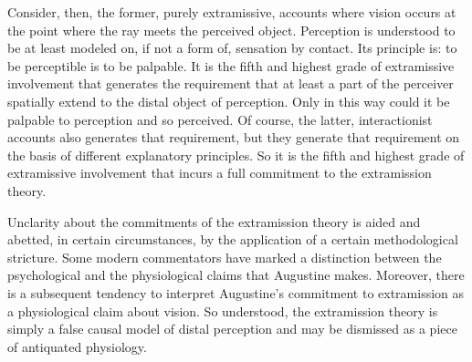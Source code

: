 \documentclass[12pt]{article}
\begin{document}
Consider, then, the former, purely extramissive, accounts where vision occurs at the point where the ray meets the perceived object. Perception is understood to be at least modeled on, if not a form of, sensation by contact. Its principle is: to be perceptible is to be palpable. It is the fifth and highest grade of extramissive involvement that generates the requirement that at least a part of the perceiver spatially extend to the distal object of perception. Only in this way could it be palpable to perception and so perceived. Of course, the latter, interactionist accounts also generates that requirement, but they generate that requirement on the basis of different explanatory principles. So it is the fifth and highest grade of extramissive involvement that incurs a full commitment to the extramission theory. 

Unclarity about the commitments of the extramission theory is aided and abetted, in certain circumstances, by the application of a certain methodological stricture. Some modern commentators have marked a distinction between the psychological and the physiological claims that Augustine makes. Moreover, there is a subsequent tendency to interpret Augustine's commitment to extramission as a physiological claim about vision. So understood, the extramission theory is simply a false causal model of distal perception and may be dismissed as a piece of antiquated physiology.
\end{document}
